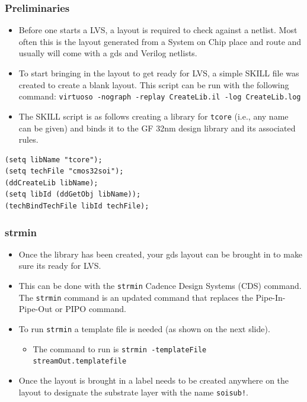 \documentclass{beamer}
\begin{document}
\begin{frame}[fragile]
\frametitle{Preliminaries}
\begin{itemize}
\item Before one starts a LVS, a layout is required to check against a
  netlist.  Most often this is the layout generated from a System on
  Chip place and route and usually will come with a gds and Verilog
  netlists.
\item To start bringing in the layout to get ready for LVS, a simple
  SKILL file was created to create a blank layout.  This script can be
  run with the following 
  command: \verb+virtuoso -nograph -replay CreateLib.il -log CreateLib.log+
\item The SKILL script is as follows creating a library for
  \verb+tcore+ (i.e., any name can be given) and binds it to the
  GF 32nm design library and its associated rules.
\end{itemize}
\footnotesize
\begin{verbatim}
(setq libName "tcore");
(setq techFile "cmos32soi");
(ddCreateLib libName);
(setq libId (ddGetObj libName));
(techBindTechFile libId techFile);
\end{verbatim}
\normalsize
\end{frame}
\begin{frame}[fragile]
\frametitle{strmin}
\begin{itemize}
\item Once the library has been created, your gds layout can be
  brought in to make sure its ready for LVS.
\item This can be done with the \verb+strmin+ Cadence Design Systems (CDS)
  command.  The \verb+strmin+ command is an updated command that
  replaces the Pipe-In-Pipe-Out or PIPO command.
\item To run \verb+strmin+ a template file is needed (as shown on the
  next slide).
  \begin{itemize}
  \item The command to run is \verb+strmin -templateFile streamOut.templatefile+
  \end{itemize}
\item Once the layout is brought in a label needs to be created
  anywhere on the layout to designate the substrate layer with the
  name \verb+soisub!+.
\end{itemize}
\end{frame}
\end{document}
